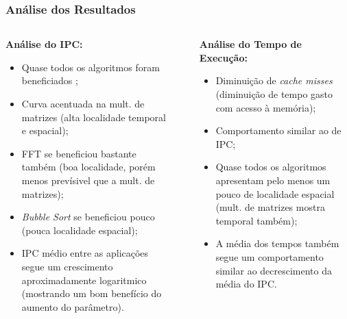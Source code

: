 \documentclass{beamer}
\begin{document}
    \begin{frame}
        \frametitle{Análise dos Resultados}

        \begin{columns}
            \begin{column}{0.45\textwidth}
                \begin{center}
                    \large
                    \textbf{Análise do IPC:}
                \end{center}
                \begin{itemize}
                    \footnotesize
                    \justifying
                    \item Quase todos os algoritmos foram beneficiados ;
                    \item Curva acentuada na mult. de matrizes (alta localidade temporal e espacial);
                    \item FFT se beneficiou bastante também (boa localidade, porém menos prevísivel que a mult. de matrizes);
                    \item \textit{Bubble Sort} se beneficiou pouco (pouca localidade espacial);
                    \item IPC médio entre as aplicações segue um crescimento aproximadamente logaritmico (mostrando um bom benefício do aumento do parâmetro).
                \end{itemize}
            \end{column}

            \begin{column}{0.01\textwidth}
                \rule{.1mm}{0.875\textheight}
            \end{column}

            \begin{column}{0.45\textwidth}
                \begin{center}
                    \large
                    \textbf{Análise do Tempo de Execução:}
                \end{center}
                \begin{itemize}
                    \footnotesize
                    \justifying
                    \item Diminuição de \textit{cache misses} (diminuição de tempo gasto com acesso à memória);
                    \item Comportamento similar ao de IPC;
                    \item Quase todos os algoritmos apresentam pelo menos um pouco de localidade espacial (mult. de matrizes mostra temporal também);
                    \item A média dos tempos também segue um comportamento similar ao decrescimento da média do IPC.
                \end{itemize}
            \end{column}
        \end{columns}
    \end{frame}
\end{document}
